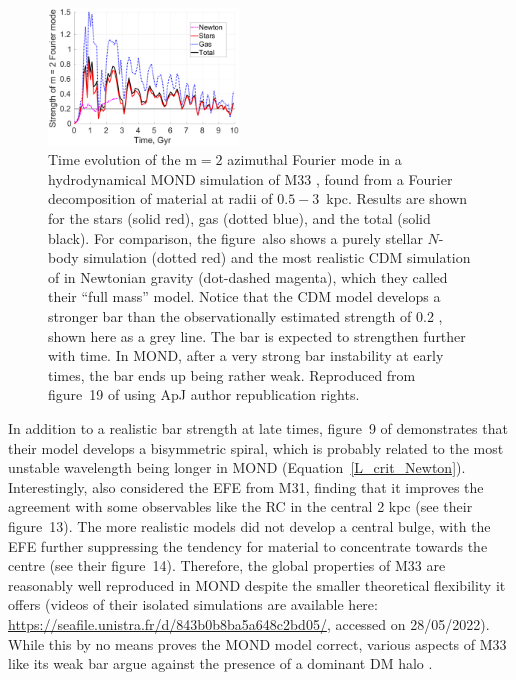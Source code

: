 \documentclass[fleqn,usenatbib,useAMS,onecolumn]{mnras} %
\begin{document}
\begin{figure}
	\centering
	\includegraphics[width=0.45\textwidth]{Banik_2020_M33_Figure_19}
	\caption{Time evolution of the $\mathrm{m} = 2$ azimuthal Fourier mode in a hydrodynamical MOND simulation of M33 \citep{Banik_2020_M33}, found from a Fourier decomposition of material at radii of $0.5-3$~kpc. Results are shown for the stars (solid red), gas (dotted blue), and the total (solid black). For comparison, the figure~also shows a purely stellar $N$-body simulation (dotted red) and the most realistic CDM simulation of \citet{Sellwood_2019} in Newtonian gravity (dot-dashed magenta), which they called their ``full mass'' model. Notice that the CDM model develops a stronger bar than the observationally estimated strength of 0.2 \citep{Corbelli_Walterbos_2007}, shown here as a grey line. The bar is expected to strengthen further with time. In MOND, after a very strong bar instability at early times, the bar ends up being rather weak. Reproduced from figure~19 of \citet{Banik_2020_M33} using ApJ author republication rights.}
	\label{Banik_2020_M33_Figure_bar_strength}
\end{figure}

In addition to a realistic bar strength at late times, figure~9 of \citet{Banik_2020_M33} demonstrates that their model develops a bisymmetric spiral, which is probably related to the most unstable wavelength being longer in MOND (Equation~\ref{L_crit_Newton}). Interestingly, \citet{Banik_2020_M33} also considered the EFE from M31, finding that it improves the agreement with some observables like the RC in the central 2 kpc (see their figure~13). The more realistic models did not develop a central bulge, with the EFE further suppressing the tendency for material to concentrate towards the centre (see their figure~14). Therefore, the global properties of M33 are reasonably well reproduced in MOND despite the smaller theoretical flexibility it offers (videos of their isolated simulations are available here: \href{https://seafile.unistra.fr/d/843b0b8ba5a648c2bd05/}{https://seafile.unistra.fr/d/843b0b8ba5a648c2bd05/}, accessed on 28/05/2022). While this by no means proves the MOND model correct, various aspects of M33 like its weak bar argue against the presence of a dominant DM halo \citep{Sellwood_2019}.
\end{document}
